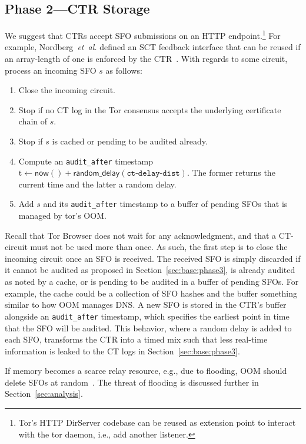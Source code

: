 \subsection{Phase 2---CTR Storage} \label{sec:base:phase2}
We suggest that CTRs accept SFO submissions on an HTTP endpoint.\footnote{%
	Tor's HTTP DirServer codebase can be reused as extension point to interact
	with the tor daemon, i.e., add another listener.
} For example, Nordberg~\emph{et~al.} defined an SCT feedback interface that can
be reused if an array-length of one is enforced by the CTR~\cite{nordberg}.
With regards to some circuit, process an incoming SFO $s$ as follows:
\begin{enumerate}
	\item\label{enm:ctr-api:close} Close the incoming circuit.
	\item\label{enm:ctr-api:unrecognized} Stop if no CT log in the Tor consensus
		accepts the underlying certificate chain of $s$.
	\item\label{enm:ctr-api:cached}
		Stop if $s$ is cached or pending to be audited already.
	\item\label{enm:ctr-api:audit-after} Compute an \texttt{audit\_after}
		timestamp $\textrm{t} \gets \mathsf{now()} +
			\mathsf{random\_delay}(\texttt{ct-delay-dist})$.
		The former returns the current time and the latter a random delay.
	\item\label{enm:ctr-api:store}
		Add $s$ and its \texttt{audit\_after} timestamp to a buffer of
		pending SFOs that is managed by tor's OOM.
\end{enumerate}

Recall that Tor Browser does not wait for any acknowledgment, and that a
CT-circuit must not be used more than once.  As such, the first step is to
close the incoming circuit once an SFO is received.  The received SFO is
simply discarded if it
	cannot be audited as proposed in Section~\ref{sec:base:phase3},
	is already audited as noted by a cache, or
	is pending to be audited in a buffer of pending SFOs.
For example, the cache could be a collection of SFO hashes and the buffer
something similar to how OOM manages DNS.  A new SFO is stored in the CTR's
buffer alongside an \texttt{audit\_after} timestamp, which specifies the
earliest point in time that the SFO will be audited.  This behavior, where a
random delay is added to each SFO, transforms the CTR into a timed mix such that
less real-time information is leaked to the CT logs in
Section~\ref{sec:base:phase3}.

If memory becomes a scarce relay resource, e.g., due to flooding, OOM
should delete SFOs at random~\cite{nordberg}.  The threat of flooding is
discussed further in Section~\ref{sec:analysis}.

